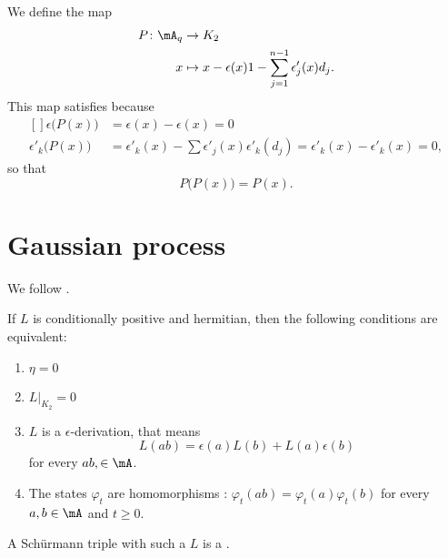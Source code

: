 We define the map
\begin{equation}
    \begin{aligned}
        P\colon \mA_q&\to K_2 \ \\
        x&\mapsto x-\epsilon(x)1-\sum_{j=1}^{n-1}\epsilon'_j(x)d_j. 
    \end{aligned}
\end{equation}
This map satisfies because
\begin{equation}
    \begin{aligned}[]
        \epsilon\big( P(x) \big)&=\epsilon(x)-\epsilon(x)=0\\
        \epsilon'_k\big( P(x) \big)&=\epsilon'_k(x)-\sum\epsilon'_j(x)\epsilon'_k(d_j)=\epsilon'_k(x)-\epsilon'_k(x)=0,
    \end{aligned}
\end{equation}
so that
\begin{equation}
    P\big( P(x) \big)=P(x).
\end{equation}



\section{Gaussian process}

We follow \cite{UweLevy}.

\begin{proposition}
    If $L$ is conditionally positive and hermitian, then the following conditions are equivalent:
    \begin{enumerate}
        \item
            $\eta=0$
        \item
            $L|_{K_2}=0$
        \item
            $L$ is a $\epsilon$-derivation, that means
            \begin{equation}
                L(ab)=\epsilon(a)L(b)+L(a)\epsilon(b)
            \end{equation}
            for every $ab,\in\mA$.
        \item
            The states $\varphi_t$ are homomorphisms : $\varphi_t(ab)=\varphi_t(a)\varphi_t(b)$ for every $a,b\in\mA$ and $t\geq 0$.
    \end{enumerate}
\end{proposition}
A Schürmann triple with such a $L$ is a .

